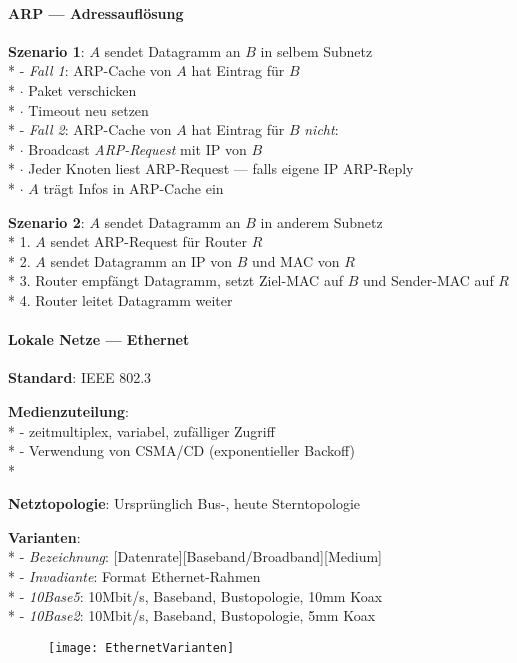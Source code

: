 \paragraph{ARP --- Adressauflösung}
\begin{items}
  \item \textbf{Szenario 1}: \( A \) sendet Datagramm an \( B \) in selbem Subnetz \\*
    - \emph{Fall 1}: ARP-Cache von \( A \) hat Eintrag für \( B \) \\*
      \phantom{-} \( \cdot \) Paket verschicken \\*
      \phantom{-} \( \cdot \) Timeout neu setzen \\*
    - \emph{Fall 2}: ARP-Cache von \( A \) hat Eintrag für \( B \) \emph{nicht}: \\*
      \phantom{-} \( \cdot \) Broadcast \emph{ARP-Request} mit IP von \( B \) \\*
      \phantom{-} \( \cdot \) Jeder Knoten liest ARP-Request --- falls eigene IP ARP-Reply \\*
      \phantom{-} \( \cdot \) \( A \) trägt Infos in ARP-Cache ein
  \item \textbf{Szenario 2}: \( A \) sendet Datagramm an \( B \) in anderem Subnetz \\*
    1. \( A \) sendet ARP-Request für Router \( R \) \\*
    2. \( A \) sendet Datagramm an IP von \( B \) und MAC von \( R \) \\*
    3. Router empfängt Datagramm, setzt Ziel-MAC auf \( B \) und Sender-MAC auf \( R \) \\*
    4. Router leitet Datagramm weiter
\end{items}

\paragraph{Lokale Netze --- Ethernet}
\begin{items}
  \item \textbf{Standard}: IEEE 802.3
  \item \textbf{Medienzuteilung}: \\*
    - zeitmultiplex, variabel, zufälliger Zugriff \\*
    - Verwendung von CSMA/CD (exponentieller Backoff) \\*
  \item \textbf{Netztopologie}: Ursprünglich Bus-, heute Sterntopologie
  \item \textbf{Varianten}: \\*
    - \emph{Bezeichnung}: [Datenrate][Baseband/Broadband][Medium] \\*
    - \emph{Invadiante}: Format Ethernet-Rahmen \\*
    - \emph{10Base5}: 10Mbit/s, Baseband, Bustopologie, 10mm Koax \\*
    - \emph{10Base2}: 10Mbit/s, Baseband, Bustopologie, 5mm Koax
\end{items}
\begin{figure}[H]\centering\label{EthernetVarianten}\texttt{[image: EthernetVarianten]}\end{figure}

